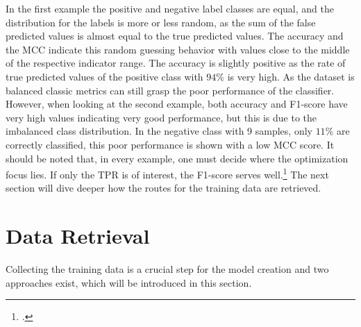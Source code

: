 In the first example the positive and negative label classes are equal, and the distribution for the
labels is more or less random, as the sum of the false predicted values is almost equal to
the true predicted values. The accuracy and the \gls{MCC} indicate this random guessing
behavior with values close to the middle of the respective indicator range.
The accuracy is slightly positive as the rate of true predicted values of the positive class
with $94\%$ is very high. As the dataset is balanced classic metrics can still grasp
the poor performance of the classifier. However, when looking at the second example, both
accuracy and F1-score have very high values indicating very good performance, but this is
due to the imbalanced class distribution. In the negative class with 9 samples, only $11\%$
are correctly classified, this poor performance is shown with a low \gls{MCC} score.
It should be noted that, in every example, one must decide where the optimization focus lies.
If only the \gls{TPR} is of interest, the F1-score serves well.\footcite[cf.][p.8f.]{chicco_advantages_2020}
The next section will dive deeper how the routes for the training data are retrieved.


\section{Data Retrieval}
\label{sec:DataRetrieval}

Collecting the training data is a crucial step for the model creation and two approaches exist, which will be
introduced in this section.

